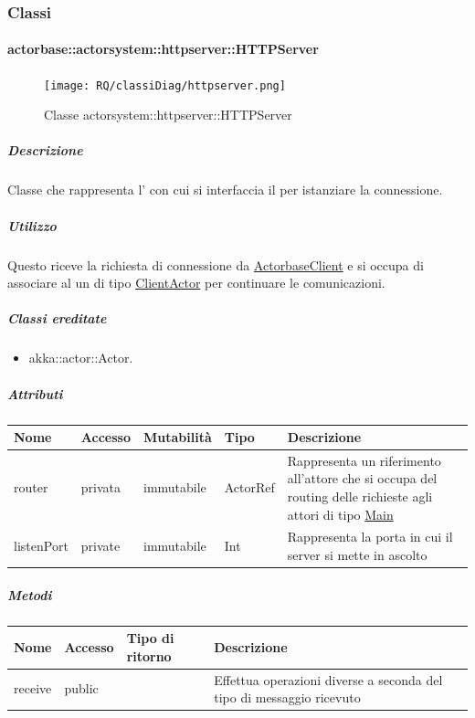 \documentclass{scalatekids-article}
\begin{document}
\subsubsection{Classi}

\paragraph{actorbase::actorsystem::httpserver::HTTPServer}
\label{sec:actorbase::actorsystem::httpserver::HTTPServer}

\begin{figure}[H]
  \begin{center}
    \texttt{[image: RQ/classiDiag/httpserver.png]}
    \caption{Classe actorsystem::httpserver::HTTPServer}
  \end{center}
\end{figure}

\subparagraph{Descrizione}
Classe che rappresenta l' con cui si interfaccia il  per
istanziare la connessione.

\subparagraph{Utilizzo}

Questo  riceve la richiesta di connessione da
\hyperref[sec:actorbase::driver::client::ActorbaseClient]{ActorbaseClient}
e si occupa di associare al  un  di tipo
\hyperref[sec:actorbase::actorsystem::clientactor::ClientActor]{ClientActor}
per continuare le comunicazioni.

\subparagraph{Classi ereditate}
\begin{itemize}
\item akka::actor::Actor.
\end{itemize}

\subparagraph{Attributi}
\begin{tabular}{| p{3cm} | p{1.5cm} | p{2cm} | p{2cm} | p{8.5cm} |}
  \hline
  Nome & Accesso & Mutabilità & Tipo & Descrizione\\
  \hline
  router & privata & immutabile & ActorRef & Rappresenta un riferimento all'attore che si occupa del routing delle richieste agli attori di tipo \hyperref[sec:actorbase::actorsystem::main::Main]{Main} \\
  \hline
  listenPort & private & immutabile & Int & Rappresenta la porta in cui il server si mette in ascolto \\
  \hline
\end{tabular}

\subparagraph{Metodi}

\begin{tabular}{| l | l | l | l |}
  \hline
  Nome & Accesso & Tipo di ritorno & Descrizione\\
  \hline
  receive & public &  & Effettua operazioni diverse a seconda del tipo di messaggio ricevuto\\
  \hline
\end{tabular}
\end{document}
